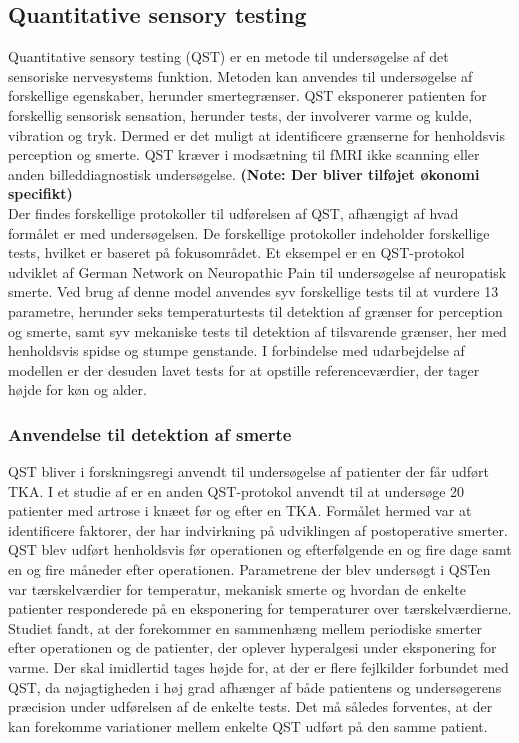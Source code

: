 \subsection{Quantitative sensory testing}
Quantitative sensory testing (QST) er en metode til undersøgelse af det sensoriske nervesystems funktion. Metoden kan anvendes til undersøgelse af forskellige egenskaber, herunder smertegrænser. QST eksponerer patienten for forskellig sensorisk sensation, herunder tests, der involverer varme og kulde, vibration og tryk. Dermed er det muligt at identificere grænserne for henholdsvis perception og smerte. \citep{Yarnitsky2006} QST kræver i modsætning til fMRI ikke scanning eller anden billeddiagnostisk undersøgelse. \textbf{(Note: Der bliver tilføjet økonomi specifikt)} \\
Der findes forskellige protokoller til udførelsen af QST, afhængigt af hvad formålet er med undersøgelsen. De forskellige protokoller indeholder forskellige tests, hvilket er baseret på fokusområdet. Et eksempel er en QST-protokol udviklet af German Network on Neuropathic Pain til undersøgelse af neuropatisk smerte. Ved brug af denne model anvendes syv forskellige tests til at vurdere 13 parametre, herunder seks temperaturtests til detektion af grænser for perception og smerte, samt syv mekaniske tests til detektion af tilsvarende grænser, her med henholdsvis spidse og stumpe genstande. I forbindelse med udarbejdelse af modellen er der desuden lavet tests for at opstille referenceværdier, der tager højde for køn og alder. \citep{Rolke2006}  

\subsubsection{Anvendelse til detektion af smerte}
QST bliver i forskningsregi anvendt til undersøgelse af patienter der får udført TKA. I et studie af \citep{Martinez2007} er en anden QST-protokol anvendt til at undersøge 20 patienter med artrose i knæet før og efter en TKA. Formålet hermed var at identificere faktorer, der har indvirkning på udviklingen af postoperative smerter. QST blev udført henholdsvis før operationen og efterfølgende en og fire dage samt en og fire måneder efter operationen. Parametrene der blev undersøgt i QSTen var tærskelværdier for temperatur, mekanisk smerte og hvordan de enkelte patienter responderede på en eksponering for temperaturer over tærskelværdierne. Studiet fandt, at der forekommer en sammenhæng mellem periodiske smerter efter operationen og de patienter, der oplever hyperalgesi under eksponering for varme. \citep{Martinez2007} Der skal imidlertid tages højde for, at der er flere fejlkilder forbundet med QST, da nøjagtigheden i høj grad afhænger af både patientens og undersøgerens præcision under udførelsen af de enkelte tests. Det må således forventes, at der kan forekomme variationer mellem enkelte QST udført på den samme patient. \citep{Yarnitsky2006}

